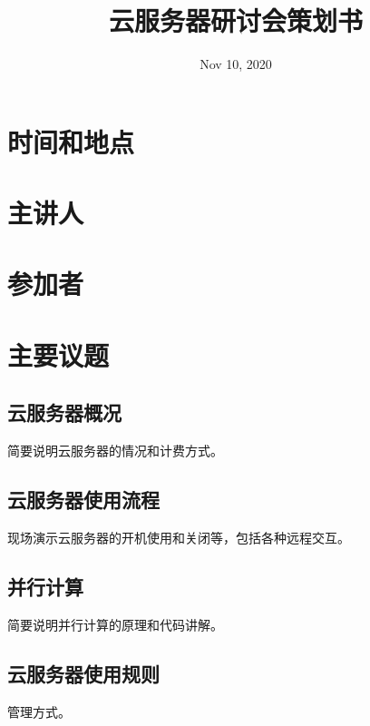 \documentclass[utf8]{ctexart}
\title{
    {云服务器研讨会策划书}
}
\date{Nov 10, 2020}
\begin{document}
    \maketitle
    \section{时间和地点}

    \section{主讲人}

    \section{参加者}

    \section{主要议题}
        \subsection{云服务器概况}
            简要说明云服务器的情况和计费方式。
        \subsection{云服务器使用流程}
            现场演示云服务器的开机使用和关闭等，包括各种远程交互。
        \subsection{并行计算}
            简要说明并行计算的原理和代码讲解。
        \subsection{云服务器使用规则}
            管理方式。
\end{document}
